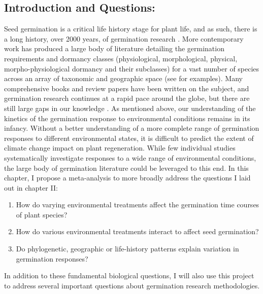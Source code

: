 \documentclass[12pt]{article}\usepackage[]{graphicx}\usepackage[]{color}
\begin{document}
\subsection*{Introduction and Questions:}
\indent\indent Seed germination is a critical life history stage for plant life, and as such, there is a long history, over 2000 years, of germination research \citep{Baskin2014, Fenner2000}. More contemporary work has produced a large body of literature detailing the germination requirements and dormancy classes (physiological, morphological, physical, morpho-physiological dormancy and their subclasses) for a vast number of species across an array of taxonomic and geographic space (see \citet{Baskin2014} for examples). Many comprehensive books and review papers have been written on the subject, and germination research continues at a rapid pace around the globe, but there are still large gaps in our knowledge \citep{Baskin2014}. As mentioned above, our understanding of the kinetics of the germination response to environmental conditions remains in its infancy. Without a better understanding of a more complete range of germination responses to different environmental states, it is difficult to predict the extent of climate change impact on plant regeneration. While few individual studies systematically investigate responses to a wide range of environmental conditions, the large body of germination literature could be leveraged to this end. In this chapter, I propose a meta-analysis to more broadly address the questions I laid out in chapter II:
\begin{enumerate}
\item How do varying environmental treatments affect the germination time courses of plant species?
\item How do various environmental treatments interact to affect seed germination?
\item Do phylogenetic, geographic or life-history patterns explain variation in germination responses?
\end{enumerate}
\indent\indent In addition to these fundamental biological questions, I will also use this project to address several important questions about germination research methodologies.
\end{document}
